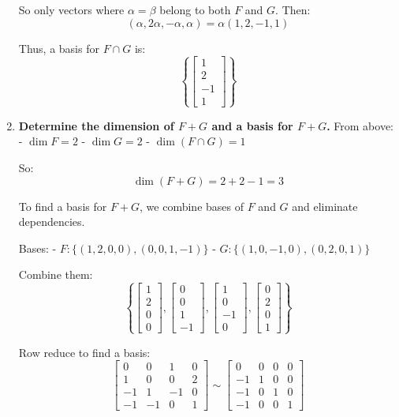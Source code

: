 \documentclass[12pt]{article}
\begin{document}
\begin{answerbox}
\begin{enumerate}
    So only vectors where $ \alpha = \beta $ belong to both $ F $ and $ G $. Then:
    $$
    (\alpha, 2\alpha, -\alpha, \alpha) = \alpha(1, 2, -1, 1)
    $$
    
    Thus, a basis for $ F \cap G $ is:
    $$
    \boxed{
    \left\{
    \begin{bmatrix}
    1 \\ 2 \\ -1 \\ 1
    \end{bmatrix}
    \right\}
    }
    $$
    \item \textbf{Determine the dimension of $ F + G $ and a basis for $ F + G $.}
    From above:
    - $ \dim F = 2 $
    - $ \dim G = 2 $
    - $ \dim(F \cap G) = 1 $
    
    So:
    $$
    \dim(F + G) = 2 + 2 - 1 = 3
    $$
    
    To find a basis for $ F + G $, we combine bases of $ F $ and $ G $ and eliminate dependencies.
    
    Bases:
    - $ F: \{(1, 2, 0, 0), (0, 0, 1, -1)\} $
    - $ G: \{(1, 0, -1, 0), (0, 2, 0, 1)\} $
    
    Combine them:
    $$
    \left\{
    \begin{bmatrix}
    1 \\ 2 \\ 0 \\ 0
    \end{bmatrix},
    \begin{bmatrix}
    0 \\ 0 \\ 1 \\ -1
    \end{bmatrix},
    \begin{bmatrix}
    1 \\ 0 \\ -1 \\ 0
    \end{bmatrix},
    \begin{bmatrix}
    0 \\ 2 \\ 0 \\ 1
    \end{bmatrix}
    \right\}
    $$
    
    Row reduce to find a basis:
$$
\begin{bmatrix}
0 & 0 & 1 & 0 \\
1 & 0 & 0 & 2 \\
-1 & 1 & -1 & 0 \\
-1 & -1 & 0 & 1
\end{bmatrix}
\sim
\begin{bmatrix}
0 & 0 & 0 & 0 \\
-1 & 1 & 0 & 0 \\
-1 & 0 & 1 & 0 \\
-1 & 0 & 0 & 1
\end{bmatrix}
$$


\end{enumerate}
\end{answerbox}
\end{document}
